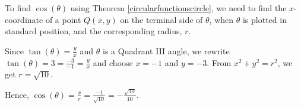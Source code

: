 \documentclass{ximera}
\begin{document}
\begin{example}
\begin{explanation}
\begin{enumerate}
 To find $\cos(\theta)$ using Theorem \ref{circularfunctionscircle},  we need to find the $x$-coordinate of a point $Q(x,y)$ on the terminal side of $\theta$, when $\theta$ is plotted in standard position,  and the corresponding radius, $r$.



Since $\tan(\theta) = \frac{y}{x}$ and $\theta$ is a Quadrant III angle, we rewrite $\tan(\theta) = 3 = \frac{-3}{-1}  = \frac{y}{x}$ and choose $x = -1$ and $y = -3$.  From $x^2+y^2 = r^2$, we get $r = \sqrt{10}$.



Hence, $\cos(\theta) = \frac{x}{r} = \frac{-1}{\sqrt{10}} = -\frac{\sqrt{10}}{10}$.

\begin{image}
\end{image}
\end{enumerate}
\end{explanation}
\end{example}
\end{document}

